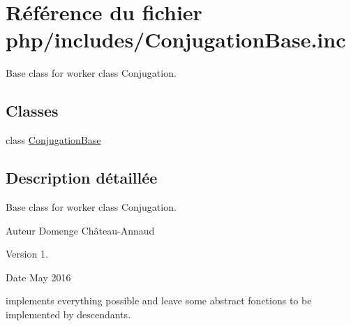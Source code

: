 \hypertarget{ConjugationBase_8inc}{}\section{Référence du fichier php/includes/\+Conjugation\+Base.inc}
\label{ConjugationBase_8inc}


Base class for worker class Conjugation.  


\subsection*{Classes}
\begin{DoxyCompactItemize}
\item 
class \hyperlink{classConjugationBase}{Conjugation\+Base}
\end{DoxyCompactItemize}


\subsection{Description détaillée}
Base class for worker class Conjugation. 

\begin{DoxyAuthor}{Auteur}
Domenge Château-\/\+Annaud 
\end{DoxyAuthor}
\begin{DoxyVersion}{Version}
1. 
\end{DoxyVersion}
\begin{DoxyDate}{Date}
May 2016
\end{DoxyDate}
implements everything possible and leave some abstract fonctions to be implemented by descendants. 